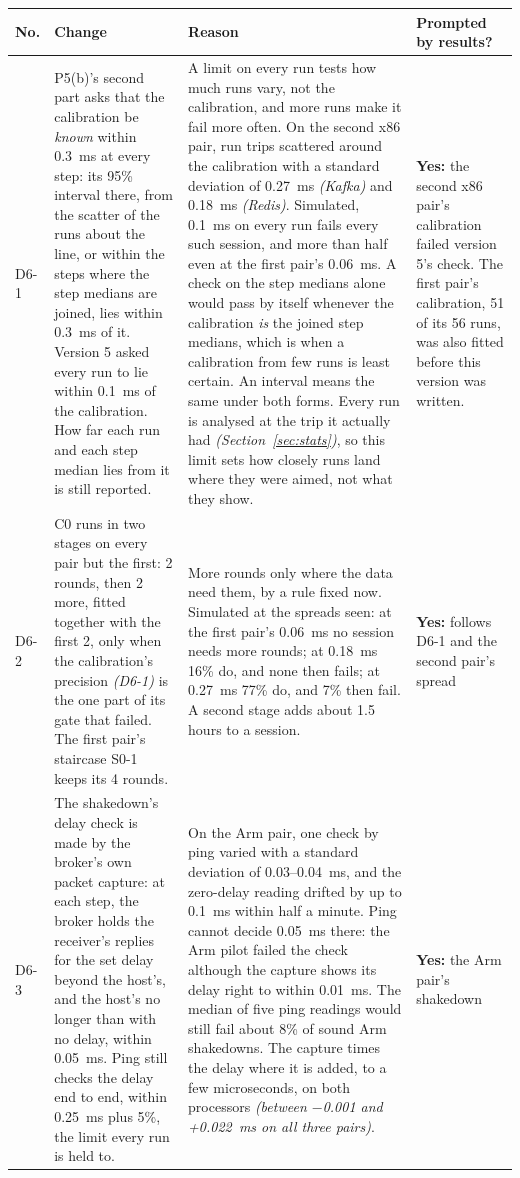 \documentclass[11pt]{article}
\newcommand{\gl}[1]{{\color{soft}\itshape\small (#1)}}
\begin{document}
{\small
\begin{longtable}{@{}p{1.0cm} >{\raggedright\arraybackslash}p{6.2cm} >{\raggedright\arraybackslash}p{6.0cm} >{\raggedright\arraybackslash}p{2.2cm}@{}}
\toprule
\textbf{No.} & \textbf{Change} & \textbf{Reason} & \textbf{Prompted by results?} \\
\midrule
\endhead
D6-1 & P5(b)'s second part asks that the calibration be \emph{known} within 0.3~ms at every step: its 95\% interval there, from the scatter of the runs about the line, or within the steps where the step medians are joined, lies within 0.3~ms of it. Version 5 asked every run to lie within 0.1~ms of the calibration. How far each run and each step median lies from it is still reported. & A limit on every run tests how much runs vary, not the calibration, and more runs make it fail more often. On the second x86 pair, run trips scattered around the calibration with a standard deviation of 0.27~ms \gl{Kafka} and 0.18~ms \gl{Redis}. Simulated, 0.1~ms on every run fails every such session, and more than half even at the first pair's 0.06~ms. A check on the step medians alone would pass by itself whenever the calibration \emph{is} the joined step medians, which is when a calibration from few runs is least certain. An interval means the same under both forms. Every run is analysed at the trip it actually had \gl{Section~\ref{sec:stats}}, so this limit sets how closely runs land where they were aimed, not what they show. & \textbf{Yes:} the second x86 pair's calibration failed version 5's check. The first pair's calibration, 51 of its 56 runs, was also fitted before this version was written. \\
D6-2 & C0 runs in two stages on every pair but the first: 2 rounds, then 2 more, fitted together with the first 2, only when the calibration's precision \gl{D6-1} is the one part of its gate that failed. The first pair's staircase S0-1 keeps its 4 rounds. & More rounds only where the data need them, by a rule fixed now. Simulated at the spreads seen: at the first pair's 0.06~ms no session needs more rounds; at 0.18~ms 16\% do, and none then fails; at 0.27~ms 77\% do, and 7\% then fail. A second stage adds about 1.5 hours to a session. & \textbf{Yes:} follows D6-1 and the second pair's spread \\
D6-3 & The shakedown's delay check is made by the broker's own packet capture: at each step, the broker holds the receiver's replies for the set delay beyond the host's, and the host's no longer than with no delay, within 0.05~ms. Ping still checks the delay end to end, within 0.25~ms plus 5\%, the limit every run is held to. & On the Arm pair, one check by ping varied with a standard deviation of 0.03--0.04~ms, and the zero-delay reading drifted by up to 0.1~ms within half a minute. Ping cannot decide 0.05~ms there: the Arm pilot failed the check although the capture shows its delay right to within 0.01~ms. The median of five ping readings would still fail about 8\% of sound Arm shakedowns. The capture times the delay where it is added, to a few microseconds, on both processors \gl{between $-$0.001 and +0.022~ms on all three pairs}. & \textbf{Yes:} the Arm pair's shakedown \\

\end{longtable}}
\end{document}

